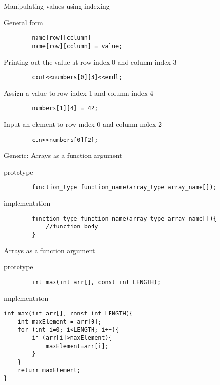 \documentclass[xcolor={dvipsnames}]{beamer}
\begin{document}
\begin{frame}[fragile]{Manipulating values using indexing}
	\begin{block}{General form}
	\begin{verbatim}
		name[row][column]
		name[row][column] = value;
	\end{verbatim}
	\end{block}
	\pause
	\begin{block}{Printing out the value at row index 0 and column index 3}
	\begin{verbatim}
		cout<<numbers[0][3]<<endl;
	\end{verbatim}
	\end{block}
	\pause
	\begin{block}{Assign a value to row index 1 and column index 4}
	\begin{verbatim}
		numbers[1][4] = 42;
	\end{verbatim}
	\end{block}
	\pause
	\begin{block}{Input an element to row index 0 and column index 2}
	\begin{verbatim}
		cin>>numbers[0][2];
	\end{verbatim}
	\end{block}
\end{frame}

\begin{frame}[fragile]{Generic: Arrays as a function argument}
	\begin{block}{prototype}
	\begin{verbatim}
		function_type function_name(array_type array_name[]);
	\end{verbatim}
	\end{block}
	\pause
	\begin{block}{implementation}
	\begin{verbatim}
		function_type function_name(array_type array_name[]){
			//function body
		}
	\end{verbatim}
	\end{block}
\end{frame}

\begin{frame}[fragile]{Arrays as a function argument}
	\begin{block}{prototype}
	\begin{verbatim}
		int max(int arr[], const int LENGTH);
	\end{verbatim}
	\end{block}
	\pause
	\begin{block}{implementaton}
	\begin{verbatim}
int max(int arr[], const int LENGTH){
    int maxElement = arr[0];
    for (int i=0; i<LENGTH; i++){
        if (arr[i]>maxElement){
            maxElement=arr[i];
        }
    }
    return maxElement; 
}
	\end{verbatim}
	\end{block}
\end{frame}
\end{document}
